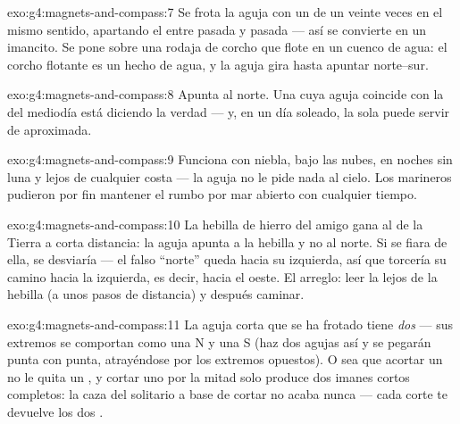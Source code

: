 \begin{solution}{exo:g4:magnets-and-compass:7}
Se frota la aguja con un  de un  veinte veces en el
mismo sentido, apartando el  entre pasada y pasada --- así se
convierte en un imancito. Se pone sobre una rodaja de corcho que flote
en un cuenco de agua: el corcho flotante es un  hecho
de agua, y la aguja gira hasta apuntar norte--sur.
\end{solution}

\begin{solution}{exo:g4:magnets-and-compass:8}
Apunta al norte. Una  cuya aguja coincide con la  del
mediodía está diciendo la verdad --- y, en un día soleado, la 
sola puede servir de  aproximada.
\end{solution}

\begin{solution}{exo:g4:magnets-and-compass:9}
Funciona con niebla, bajo las nubes, en noches sin luna y lejos de
cualquier costa --- la aguja no le pide nada al cielo. Los marineros
pudieron por fin mantener el rumbo por mar abierto con cualquier
tiempo.
\end{solution}

\begin{solution}{exo:g4:magnets-and-compass:10}
La hebilla de hierro del amigo gana al  de la Tierra a corta
distancia: la aguja apunta a la hebilla y no al norte. Si se fiara de
ella, se desviaría --- el falso ``norte'' queda hacia su izquierda,
así que torcería su camino hacia la izquierda, es decir, hacia el
oeste. El arreglo: leer la  lejos de la hebilla (a unos
pasos de distancia) y después caminar.
\end{solution}

\begin{solution}{exo:g4:magnets-and-compass:11}
La aguja corta que se ha frotado tiene \emph{dos}  --- sus
extremos se comportan como una N y una S (haz  dos agujas así
y se pegarán punta con punta, atrayéndose por los extremos opuestos).
O sea que acortar un  no le quita un , y cortar uno por
la mitad solo produce dos imanes cortos completos: la caza del
 solitario a base de cortar no acaba nunca --- cada corte te
devuelve los dos .
\end{solution}
